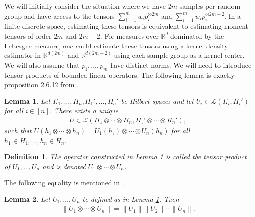 \documentclass[aos,preprint]{imsart}
\def\rn{\mathbb{R}}
\def\l{\left}
\def\r{\right}
\theoremstyle{plain}
\newtheorem{lem}{Lemma}[section]
\theoremstyle{defintion}
\newtheorem{defin}{Definition}[section]
\begin{document}
We will initially consider the situation where we have $2m$ samples per random group and have access to the tensors $\sum_{i=1}^m w_i p_i^{\otimes 2m}$ and $\sum_{i=1}^m w_i p_i^{\otimes 2m-2}$. In a finite discrete space, estimating these tensors is equivalent to estimating moment tensors of order $2m$ and $2m-2$. For measures over $\rn^d$ dominated by the Lebesgue measure, one could estimate these tensors using a kernel density estimator in $\rn^{d(2m)}$ and $\rn^{d(2m-2)}$ using each sample group as a kernel center. We will also assume that $p_1,\ldots,p_m$ have distinct norms. We will need to introduce tensor products of bounded linear operators. The following lemma is exactly proposition 2.6.12 from \cite{kadison83}.
\begin{lem} \label{lem:hsprod}
	Let $H_1,\ldots,H_n,H_1',\ldots,H_n'$ be Hilbert spaces and let $U_i \in \mathcal{L}\l(H_i,H_i'\r)$ for all $i \in \left[ n \right]$. There exists a unique 
	\begin{align*}
		U \in \mathcal{L}\left( H_1\otimes \cdots \otimes H_n,H_1'\otimes \cdots \otimes H_n' \right),
	\end{align*}
	such that $U\left( h_1\otimes \cdots \otimes h_n \right) = U_1\left( h_1 \right) \otimes \cdots \otimes U_n\left( h_n \right)$ for all $h_1 \in H_1, \ldots, h_n \in H_n$.
\end{lem}
\begin{defin}\label{def:prodop}
	The operator constructed in Lemma \ref{lem:hsprod} is called the {\em tensor product of $U_1,\ldots,U_n$} and is denoted $U_1\otimes \cdots \otimes U_n$.
\end{defin}
The following equality is mentioned in \cite{kadison83}.

\begin{lem} \label{lem:prodopbnd}
	Let $U_1,\ldots,U_n$ be defined as in Lemma \ref{lem:hsprod}. Then
	\begin{align*}
		\l\|U_1 \otimes \cdots \otimes U_n \r\| = \l\|U_1\r\| \l\|U_2\r\| \cdots \l\|U_n\r\|.
	\end{align*}
\end{lem}
\end{document}
